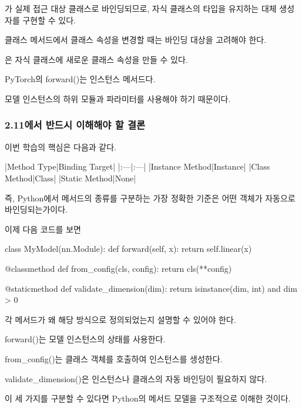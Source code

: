 가 실제 접근 대상 클래스로 바인딩되므로, 자식 클래스의 타입을 유지하는 대체 생성자를 구현할 수 있다.

\begin{dhknote}
\begin{dhksmry}[centered]
클래스 메서드에서 클래스 속성을 변경할 때는
바인딩 대상을 고려해야 한다.
\end{dhksmry}
\end{dhknote}

은 자식 클래스에 새로운 클래스 속성을 만들 수 있다.

\begin{dhknote}
\begin{dhksmry}[centered]
PyTorch의 forward()는 인스턴스 메서드다.
\end{dhksmry}
\end{dhknote}

모델 인스턴스의 하위 모듈과 파라미터를 사용해야 하기 때문이다.

\subsubsection{2.11에서 반드시 이해해야 할 결론}

이번 학습의 핵심은 다음과 같다.

\begin{dhktable}
|Method Type|Binding Target|
|:---|:---|
|Instance Method|Instance|
|Class Method|Class|
|Static Method|None|
\end{dhktable}

즉, Python에서 메서드의 종류를 구분하는 가장 정확한 기준은 어떤 객체가 자동으로 바인딩되는가이다.

이제 다음 코드를 보면

\begin{dhkcode}
class MyModel(nn.Module):
    def forward(self, x):
        return self.linear(x)

    @classmethod
    def from_config(cls, config):
        return cls(**config)

    @staticmethod
    def validate_dimension(dim):
        return isinstance(dim, int) and dim > 0
\end{dhkcode}

각 메서드가 왜 해당 방식으로 정의되었는지 설명할 수 있어야 한다.

\begin{dhksmry}
forward()는 모델 인스턴스의 상태를 사용한다.

from_config()는 클래스 객체를 호출하여 인스턴스를 생성한다.

validate_dimension()은 인스턴스나 클래스의 자동 바인딩이 필요하지 않다.
\end{dhksmry}

이 세 가지를 구분할 수 있다면 Python의 메서드 모델을 구조적으로 이해한 것이다.